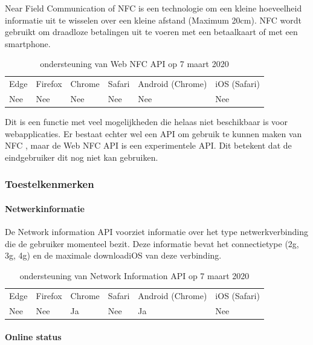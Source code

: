 	Near Field Communication of NFC is een technologie om een kleine hoeveelheid informatie uit te wisselen over een kleine afstand (Maximum 20cm). NFC wordt gebruikt om draadloze betalingen uit te voeren met een betaalkaart of met een smartphone. 
	\autocite{Paus2007}
	
	\begin{table}[H]
		\centering
		\begin{tabular}{llllll}
			Edge & Firefox & Chrome & Safari & Android (Chrome) & iOS (Safari) \\
			Nee   & Nee      &  Nee     & Nee     & Nee               & Nee          
		\end{tabular}	
		\caption{ondersteuning van Web NFC API op 7 maart 2020}
	\end{table}
	
	Dit is een functie met veel mogelijkheden die helaas niet beschikbaar is voor webapplicaties.
	Er bestaat echter wel een API om gebruik te kunnen maken van NFC \autocite{RohdeChristiansen2020}, maar de Web NFC API is een experimentele API. Dit betekent dat de eindgebruiker dit nog niet kan gebruiken.
	
	
	
	\subsubsection{Toestelkenmerken}
	
	
	\paragraph{Netwerkinformatie}
	
	De Network information API \autocite{Lamouri2014} voorziet informatie over het type netwerkverbinding die de gebruiker momenteel bezit. Deze informatie bevat het connectietype (2g, 3g, 4g) en de maximale downloadiOS van deze verbinding.
	
	\begin{table}[H]
		\centering
		\begin{tabular}{llllll}
			Edge & Firefox & Chrome & Safari & Android (Chrome) & iOS (Safari) \\
			Nee   & Nee      &  Ja     & Nee     & Ja               & Nee          
		\end{tabular}	
		\caption{ondersteuning van Network Information API op 7 maart 2020}
	\end{table}
	
	\paragraph{Online status}
	
